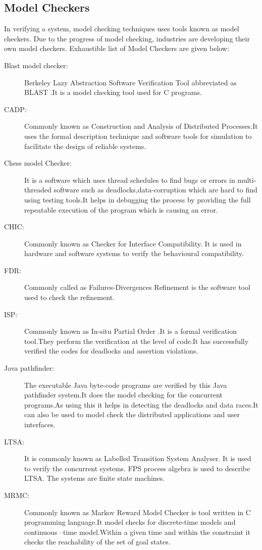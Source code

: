 \documentclass[a4paper,12pt]{extarticle}
\begin{document}
\subsection{Model Checkers}
In verifying a system, model checking techniques uses tools known as model checkers. Due to the progress of model checking, industries are developing their own model checkers.
Exhaustible list of  Model Checkers are given below:
\begin{description}
\item[Blast model checker:]Berkeley Lazy Abstraction Software Verification Tool abbreviated as BLAST .It is a model checking tool used for C programs.
\item[CADP:]Commonly known as  Construction and Analysis of Distributed Processes.It uses the formal description technique and software tools for simulation to facilitate the design of reliable systems.
\item[Chess model Checker:]It is a software which uses thread schedules to find bugs or errors in multi-threaded software such as deadlocks,data-corruption which are hard to find using testing tools.It helps in debugging the process by providing the full repeatable execution of the program which is causing an error.
\item[CHIC:] Commonly known as Checker for Interface Compatibility. It is used in hardware and software systems to verify the behavioural compatibility.
\item[FDR:] Commonly called as Failures-Divergences Refinement is the software tool used to check  the refinement.
\item[ISP:] Commonly known as In-situ Partial Order .It is a formal verification tool.They perform the verification at the level of code.It has successfully verified the codes for deadlocks and assertion violations.
\item[Java pathfinder:]The executable Java byte-code programs are verified by this Java pathfinder system.It does the model checking for the concurrent programs.As using this it helps in detecting the deadlocks and data races.It can also be used to model check the distributed applications and user interfaces.
\item[LTSA:] It is commonly known as Labelled Transition System Analyser. It is used to verify the concurrent systems. FPS process algebra is used to describe LTSA. The systems are finite state machines.
\item[MRMC:] Commonly known as Markov Reward Model Checker is tool written in C programming language.It model checks for discrete-time models and continuous –time model.Within a given time and within the constraint it checks the reachability of the set of goal states.

\end{description}
\end{document}
